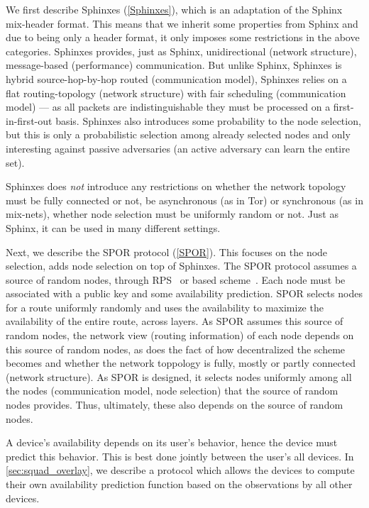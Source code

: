 We first describe Sphinxes (\cref{Sphinxes}), which is an adaptation of the 
Sphinx~\cite{Sphinx} mix-header format.
This means that we inherit some properties from Sphinx and due to being only a 
header format, it only imposes some restrictions in the above categories.
Sphinxes provides, just as Sphinx, unidirectional (network structure), 
message-based (performance) communication.
But unlike Sphinx, Sphinxes is hybrid source-hop-by-hop routed (communication 
model),
Sphinxes relies on a flat routing-topology (network structure) with fair 
scheduling (communication model) --- as all packets are indistinguishable they 
must be processed on a first-in-first-out basis.
Sphinxes also introduces some probability to the node selection, but this is 
only a probabilistic selection among already selected nodes and only 
interesting against passive adversaries (an active adversary can learn the 
entire set).

Sphinxes does \emph{not} introduce any restrictions on whether the network 
topology must be fully connected or not, be asynchronous (as in Tor) or 
synchronous (as in mix-nets), whether node selection must be uniformly random 
or not.
Just as Sphinx, it can be used in many different settings.

Next, we describe the \ac{SPOR} protocol (\cref{SPOR}).
This focuses on the node selection, \ie adds node selection on top of Sphinxes.
The \ac{SPOR} protocol assumes a source of random nodes, \eg through 
\ac{RPS}~\cite[\eg][]{BrahmsRPS} or  based 
scheme~\cite[\eg][]{Octopus}.
Each node must be associated with a public key and some availability 
prediction.
\Ac{SPOR} selects nodes for a route uniformly randomly and uses the 
availability to maximize the availability of the entire route, \ie across 
layers.
As \ac{SPOR} assumes this source of random nodes, the network view (routing 
information) of each node depends on this source of random nodes, as does the 
fact of how decentralized the scheme becomes and whether the network toppology 
is fully, mostly or partly connected (network structure).
As \ac{SPOR} is designed, it selects nodes uniformly among all the nodes 
(communication model, node selection) that the source of random nodes provides.
Thus, ultimately, these also depends on the source of random nodes.

A device's availability depends on its user's behavior, hence the device must 
predict this behavior.
This is best done jointly between the user's all devices.
In \cref{sec:squad_overlay}, we describe a protocol which allows the devices to 
compute their own availability prediction function based on the observations by 
all other devices.

